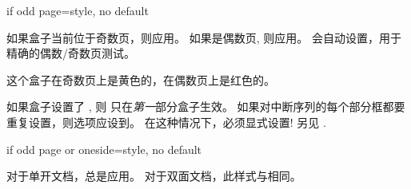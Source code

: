 \begin{docTcbKey}[][doc new=2015-11-13]{if odd page}{=}{style, no default}
  
  如果盒子当前位于奇数页，则应用。%
  如果是偶数页, 则应用。%
  会自动设置，用于精确的偶数/奇数页测试。
  
  \begin{dispExample}
  \begin{tcolorbox}[if odd page={colback=yellow!50}{colback=red!50}]
  这个盒子在奇数页上是黄色的，在偶数页上是红色的。
  \end{tcolorbox}
  \end{dispExample}
  
  \begin{marker}
  
  如果盒子设置了 , 则  只在\emph{第一}部分盒子生效。%
  如果对中断序列的每个部分框都要重复设置，则选项应设到。%
  在这种情况下，必须显式设置! 另见 .
  \end{marker}
  \end{docTcbKey}

  


\begin{docTcbKey}[][doc new=2016-11-18]{if odd page or oneside}{=}{style, no default}

对于单开文档，总是应用。%
对于双面文档，此样式与相同。
\end{docTcbKey}

